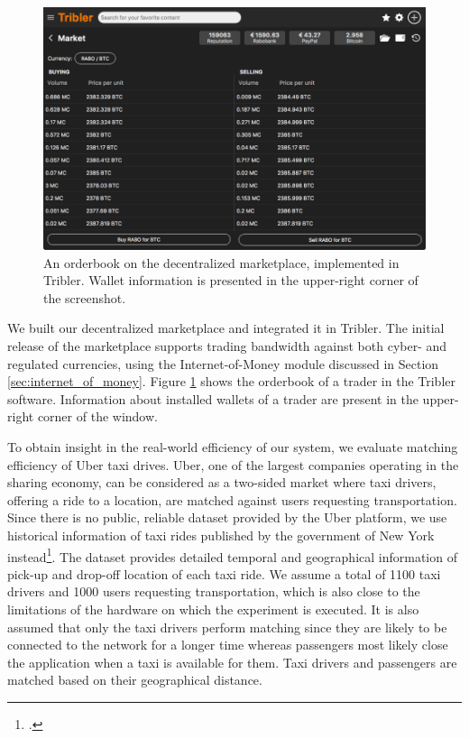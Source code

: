 \documentclass[USenglish]{article}
\begin{document}
\begin{figure}[t]
	\centering
	\includegraphics[width=.9\columnwidth]{assets/tribler_market}
	\caption{An orderbook on the decentralized marketplace, implemented in Tribler. Wallet information is presented in the upper-right corner of the screenshot.}
	\label{fig:tribler_market}
\end{figure}

We built our decentralized marketplace and integrated it in Tribler.
The initial release of the marketplace supports trading bandwidth against both cyber- and regulated currencies, using the Internet-of-Money module discussed in Section \ref{sec:internet_of_money}.
Figure \ref{fig:tribler_market} shows the orderbook of a trader in the Tribler software.
Information about installed wallets of a trader are present in the upper-right corner of the window.

To obtain insight in the real-world efficiency of our system, we evaluate matching efficiency of Uber taxi drives.
Uber, one of the largest companies operating in the sharing economy, can be considered as a two-sided market where taxi drivers, offering a ride to a location, are matched against users requesting transportation.
Since there is no public, reliable dataset provided by the Uber platform, we use historical information of taxi rides published by the government of New York instead\footcite{newyorktaxi}.
The dataset provides detailed temporal and geographical information of pick-up and drop-off location of each taxi ride.
We assume a total of 1100 taxi drivers and 1000 users requesting transportation, which is also close to the limitations of the hardware on which the experiment is executed.
It is also assumed that only the taxi drivers perform matching since they are likely to be connected to the network for a longer time whereas passengers most likely close the application when a taxi is available for them.
Taxi drivers and passengers are matched based on their geographical distance.
\end{document}
